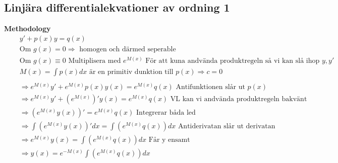 \newpage


\subsection{Linjära differentialekvationer av ordning 1}
\textbf{Methodology}  
\begin{align*}
  &\quad  y'+p(x)y = q(x)  \\
  &\quad  \text{Om } g(x)=0 \Rightarrow \text{ homogen och därmed seperable} \\
  &\quad  \text{Om } g(x)\equiv0 \text{ Multiplisera med } e^{M(x)} \text{ För att kuna andvända produktregeln
  så vi kan slå ihop } y, y' \\
  &\quad  M(x)= \int p(x)dx \text{ är en primitiv dunktion till } p(x) \Rightarrow c=0 \\
  &\quad  \\
  &\quad  \Rightarrow e^{M(x)}y'+e^{M(x)}p(x)y(x) = e^{M(x)}q(x) \text{ Antifunktionen slår ut } p(x) \\
  &\quad  \Rightarrow e^{M(x)}y'+(e^{M(x)})'y(x) = e^{M(x)}q(x)
  \text{ VL kan vi andvända produktregeln bakvänt} \\
  &\quad  \Rightarrow (e^{M(x)}y(x))' = e^{M(x)}q(x) \text{ Integrerar båda led} \\
  &\quad  \Rightarrow \int(e^{M(x)}y(x))'dx = \int(e^{M(x)}q(x))dx \text{ Antiderivatan slår ut derivatan } \\
  &\quad  \Rightarrow e^{M(x)}y(x) = \int(e^{M(x)}q(x))dx \text{ Får y ensamt } \\
  &\quad  \Rightarrow y(x) = e^{-M(x)} \int(e^{M(x)}q(x))dx \\
  &\quad  \\
\end{align*}

